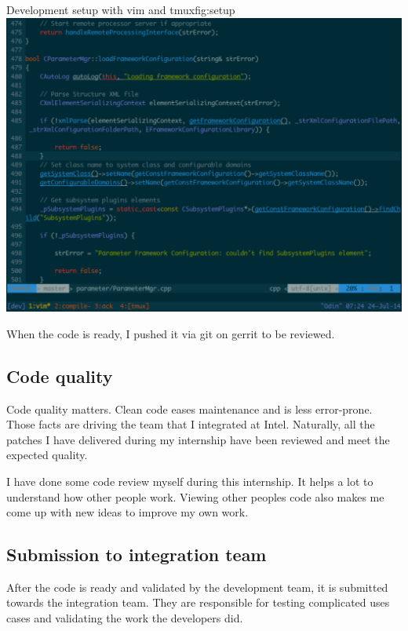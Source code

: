 \begin{figureGraphics}{Development setup with vim and tmux}{fig:setup}
\includegraphics[width=\textwidth]{./src/img/setup.pdf}
\end{figureGraphics}

When the code is ready, I pushed it via \gls{git} on \gls{gerrit} to be reviewed.

\subsection{Code quality}
Code quality matters. Clean code eases maintenance and is less error-prone.
Those facts are driving the team that I integrated at Intel. Naturally, all the
patches I have delivered during my internship have been reviewed and meet the
expected quality.

I have done some code review myself during this internship. It helps a lot to
understand how other people work. Viewing other peoples code also makes me come
up with new ideas to improve my own work.

\subsection{Submission to integration team}
After the code is ready and validated by the development team, it is submitted towards the integration team.
They are responsible for testing complicated uses cases and validating the work the developers did.

